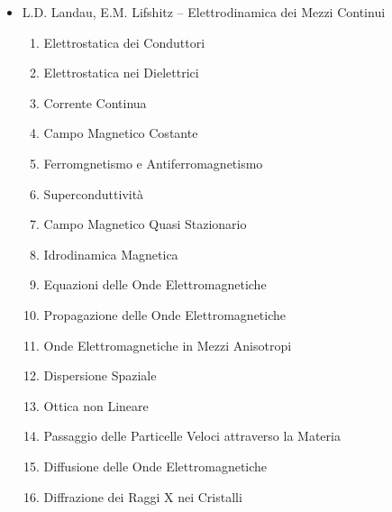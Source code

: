 \begin{itemize}
\item L.D. Landau, E.M. Lifshitz -- Elettrodinamica dei Mezzi Continui
\begin{enumerate}
\setcounter{enumi}{0}
\item Elettrostatica dei Conduttori
\item Elettrostatica nei Dielettrici
\item Corrente Continua
\item Campo Magnetico Costante
\item Ferromgnetismo e Antiferromagnetismo
\item Superconduttività
\item Campo Magnetico Quasi Stazionario
\item Idrodinamica Magnetica
\item Equazioni delle Onde Elettromagnetiche
\item Propagazione delle Onde Elettromagnetiche
\item Onde Elettromagnetiche in Mezzi Anisotropi
\item Dispersione Spaziale
\item Ottica non Lineare
\item Passaggio delle Particelle Veloci attraverso la Materia
\item Diffusione delle Onde Elettromagnetiche
\item Diffrazione dei Raggi X nei Cristalli
\end{enumerate}

\end{itemize}

